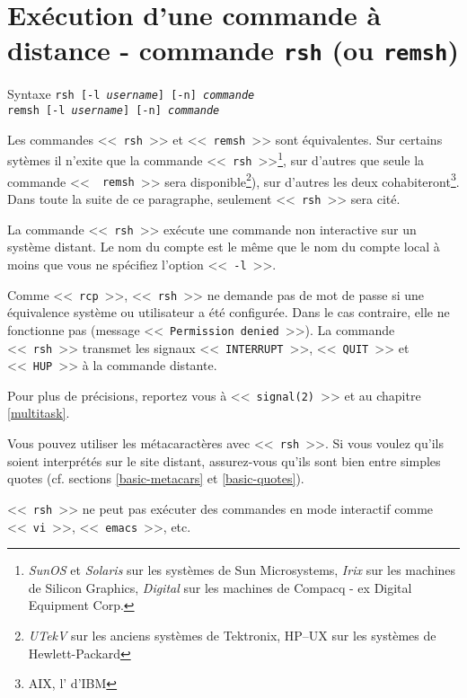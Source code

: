 \section{Ex{\'e}cution d'une commande {\`a} distance - commande {\tt rsh} (ou {\tt remsh})}

\begin{definition}{Syntaxe}
{\tt rsh [-l {\it username}] [-n] {\it commande}}\\
{\tt remsh [-l {\it username}] [-n] {\it commande}}
\end{definition}

Les commandes <<~\texttt{rsh}~>> et
<<~\texttt{remsh}~>> sont {\'e}quivalentes.
Sur certains syt{\`e}mes il n'exite que la commande
<<~\texttt{rsh}~>>\footnote{\textsl{SunOS} et  \textsl{Solaris} sur les
syst{\`e}mes de Sun Microsystems, \textsl{Irix} sur les machines de
Silicon Graphics, \textsl{Digital {\Unix}} sur les machines de Compacq -
ex Digital Equipment Corp.}, sur d'autres que seule la commande <<~{\tt
remsh}~>> sera disponible\footnote{\textsl{UTekV} sur les anciens
syst{\`e}mes {\Unix} de Tektronix, \textsf{HP--UX} sur les syst{\`e}mes
de Hewlett-Packard}), sur d'autres les deux cohabiteront\footnote{AIX,
l'{\Unix} d'IBM}. Dans toute la suite de ce paragraphe, seulement
<<~\texttt{rsh}~>> sera cit{\'e}.

La commande <<~{\tt rsh}~>> ex{\'e}cute une commande non interactive sur un
syst{\`e}me distant. Le nom du compte est le m{\^e}me que le nom du compte local
{\`a} moins que vous ne sp{\'e}cifiez l'option <<~{\tt -l}~>>.

Comme <<~{\tt rcp}~>>, <<~{\tt rsh}~>> ne demande pas de mot de passe si une
{\'e}quivalence syst{\`e}me ou utilisateur a {\'e}t{\'e} configur{\'e}e. Dans le cas
contraire, elle ne fonctionne pas (message <<~{\tt Permission denied}~>>).
La commande <<~{\tt rsh}~>> transmet les signaux <<~{\tt INTERRUPT}~>>,
<<~{\tt QUIT}~>> et <<~{\tt HUP}~>> {\`a} la commande distante.

Pour plus de pr{\'e}cisions, reportez vous {\`a} <<~{\tt signal(2)}~>> et au chapitre
\ref{multitask}.

Vous pouvez utiliser les m{\'e}tacaract{\`e}res avec <<~{\tt rsh}~>>. Si vous voulez qu'ils
soient interpr{\'e}t{\'e}s sur le site distant, assurez-vous qu'ils sont bien
entre simples quotes (cf. sections \ref{basic-metacars} et \ref{basic-quotes}).

\begin{remarque}
<<~{\tt rsh}~>> ne peut pas ex{\'e}cuter des commandes en mode interactif comme
<<~{\tt vi}~>>, <<~{\tt emacs}~>>, etc.
\end{remarque}

